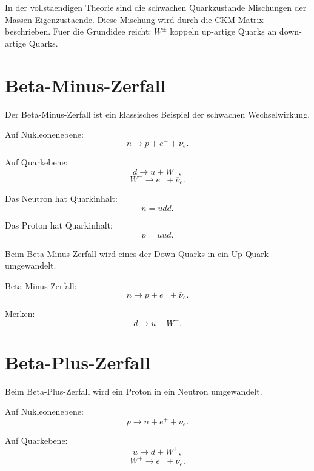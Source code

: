 \begin{notebox}
In der vollstaendigen Theorie sind die schwachen Quarkzustande Mischungen der
Massen-Eigenzustaende.
Diese Mischung wird durch die CKM-Matrix beschrieben.
Fuer die Grundidee reicht:
$W^\pm$ koppeln up-artige Quarks an down-artige Quarks.
\end{notebox}

\section{Beta-Minus-Zerfall}

Der Beta-Minus-Zerfall ist ein klassisches Beispiel der schwachen Wechselwirkung.

\begin{formulabox}
Auf Nukleonenebene:
\[
    n \rightarrow p + e^- + \overline{\nu}_e.
\]
\end{formulabox}

\begin{formulabox}
Auf Quarkebene:
\[
    d \rightarrow u + W^-,
\]
\[
    W^- \rightarrow e^- + \overline{\nu}_e.
\]
\end{formulabox}

\begin{conceptbox}
Das Neutron hat Quarkinhalt:
\[
    n=udd.
\]

Das Proton hat Quarkinhalt:
\[
    p=uud.
\]

Beim Beta-Minus-Zerfall wird eines der Down-Quarks in ein Up-Quark umgewandelt.
\end{conceptbox}

\begin{examtipbox}
Beta-Minus-Zerfall:
\[
    n \rightarrow p + e^- + \overline{\nu}_e.
\]

Merken:
\[
    d \rightarrow u + W^-.
\]
\end{examtipbox}

\section{Beta-Plus-Zerfall}

Beim Beta-Plus-Zerfall wird ein Proton in ein Neutron umgewandelt.

\begin{formulabox}
Auf Nukleonenebene:
\[
    p \rightarrow n + e^+ + \nu_e.
\]
\end{formulabox}

\begin{formulabox}
Auf Quarkebene:
\[
    u \rightarrow d + W^+,
\]
\[
    W^+ \rightarrow e^+ + \nu_e.
\]
\end{formulabox}


